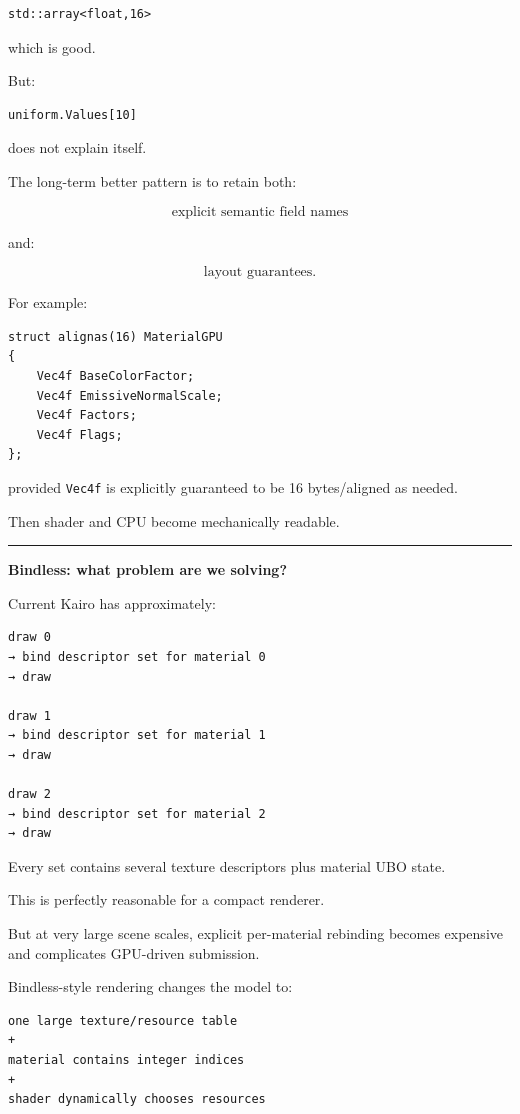 \begin{verbatim}
std::array<float,16>
\end{verbatim}

which is good.

But:

\begin{verbatim}
uniform.Values[10]
\end{verbatim}

does not explain itself.

The long-term better pattern is to retain both:

\[
\text{explicit semantic field names}
\]

and:

\[
\text{layout guarantees}.
\]

For example:

\begin{verbatim}
struct alignas(16) MaterialGPU
{
    Vec4f BaseColorFactor;
    Vec4f EmissiveNormalScale;
    Vec4f Factors;
    Vec4f Flags;
};
\end{verbatim}

provided \texttt{Vec4f} is explicitly guaranteed to be 16 bytes/aligned as needed.

Then shader and CPU become mechanically readable.

\begin{center}\rule{0.5\linewidth}{0.5pt}\end{center}

\textbf{Bindless: what problem are we solving?}

Current Kairo has approximately:

\begin{verbatim}
draw 0
→ bind descriptor set for material 0
→ draw

draw 1
→ bind descriptor set for material 1
→ draw

draw 2
→ bind descriptor set for material 2
→ draw
\end{verbatim}

Every set contains several texture descriptors plus material UBO state.

This is perfectly reasonable for a compact renderer.

But at very large scene scales, explicit per-material rebinding becomes expensive and complicates GPU-driven submission.

Bindless-style rendering changes the model to:

\begin{verbatim}
one large texture/resource table
+
material contains integer indices
+
shader dynamically chooses resources
\end{verbatim}

